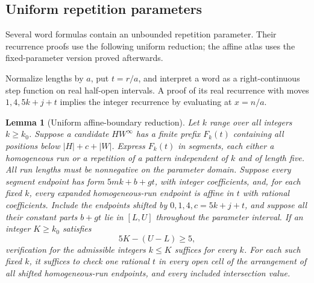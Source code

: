 \documentclass[11pt]{article}
\newtheorem{lemma}[theorem]{Lemma}
\theoremstyle{remark}\newtheorem{remark}[theorem]{Remark}
\newcommand{\per}{^{\infty}}
\begin{document}
\subsection{Uniform repetition parameters}\label{sec:affine}
Several word formulas contain an unbounded repetition parameter. Their recurrence proofs use the following uniform reduction; the affine atlas uses the fixed-parameter version proved afterwards.

Normalize lengths by $a$, put $t=r/a$, and interpret a word as a right-continuous step function on real half-open intervals. A proof of its real recurrence with moves $1,4,5k+j+t$ implies the integer recurrence by evaluating at $x=n/a$.

\begin{lemma}[Uniform affine-boundary reduction]\label{lem:affine}
Let $k$ range over all integers $k\ge k_0$. Suppose a candidate $H W\per$ has a finite prefix $F_k(t)$ containing all positions below $|H|+c+|W|$. Express $F_k(t)$ in segments, each either a homogeneous run or a repetition of a pattern independent of $k$ and of length five. All run lengths must be nonnegative on the parameter domain. Suppose every segment endpoint has form $5mk+b+gt$, with integer coefficients, and, for each fixed $k$, every expanded homogeneous-run endpoint is affine in $t$ with rational coefficients. Include the endpoints shifted by $0,1,4,c=5k+j+t$, and suppose all their constant parts $b+gt$ lie in $[L,U]$ throughout the parameter interval. If an integer $K\ge k_0$ satisfies
\[5K-(U-L)\ge5,\]
verification for the admissible integers $k\le K$ suffices for every $k$. For each such fixed $k$, it suffices to check one rational $t$ in every open cell of the arrangement of all shifted homogeneous-run endpoints, and every included intersection value.
\end{lemma}
\end{document}
